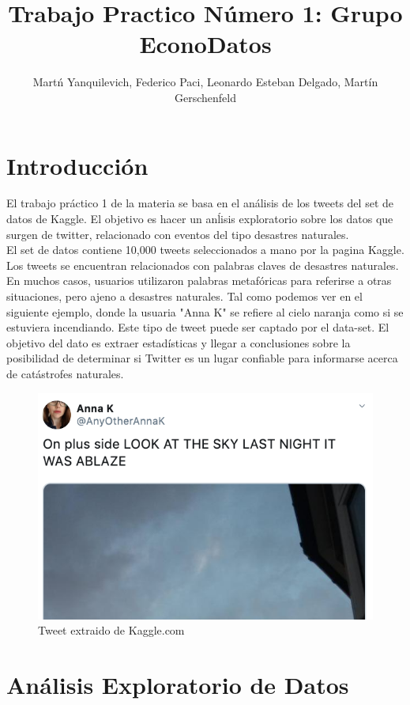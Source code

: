 \documentclass[]{article}
\title{Trabajo Practico N\'umero 1: Grupo EconoDatos}
\author{Mart\'n Yanquilevich, Federico Paci, Leonardo Esteban Delgado, Mart\'in Gerschenfeld}
\begin{document}
\tableofcontents



\maketitle

\section{Introducci\'on}
El trabajo pr\'actico 1 de la materia se basa en el an\'alisis de los tweets del set de datos de Kaggle. El objetivo es hacer un an\'lisis exploratorio sobre los datos que surgen de twitter, relacionado con eventos del tipo desastres naturales. \\

El set de datos contiene 10,000 tweets seleccionados a mano por la pagina Kaggle. Los tweets se encuentran relacionados con palabras claves de desastres naturales. En muchos casos, usuarios utilizaron palabras metaf\'oricas para referirse a otras situaciones, pero ajeno a desastres naturales. Tal como podemos ver en el siguiente ejemplo, donde la usuaria "Anna K" se refiere al cielo naranja como si se estuviera incendiando. Este tipo de tweet puede ser captado por el data-set. El objetivo del dato es extraer estad\'isticas y llegar a conclusiones sobre la posibilidad de determinar si Twitter es un lugar confiable para informarse acerca de cat\'astrofes naturales.

\begin{figure}[H]
	\centering
	\includegraphics[width=0.75\linewidth]{tweet_screenshot}
	\caption[]{Tweet extraido de Kaggle.com}
\end{figure}

\section{An\'alisis Exploratorio de Datos}
\end{document}
